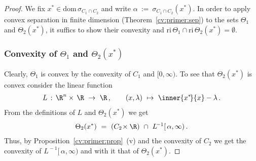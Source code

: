 \begin{proof}
  We fix 
  $ x^* \in \mathrm{dom}\, \sigma_{C_1\cap C_2} $
  and write
  $ 
  \alpha
  \ 
  :=
  \ 
  \sigma_{C_1\cap C_2}(x^*)
  $.
  In order to apply convex separation in finite dimension 
  (Theorem~\ref{cv:primer:sep})
  to
  the sets
  $ \Theta_1 $ and $ \Theta_2(x^*) $,
  it suffics to show
  their convexity and
  $
    \mathrm{ri}\, 
    \Theta_1
    \cap
    \mathrm{ri}\, 
    \Theta_2(x^*)
    =
    \emptyset
  $.
  \subsubsection*{Convexity of 
  $ \Theta_1 $ and $ \Theta_2(x^*) $
  }
  Clearly, 
  $ \Theta_1 $ is convex by the convexity of 
  $ C_1 $ and $ [0,\infty) $.
 To see that $\Theta_2(x^*)$ is convex consider the linear function
 \begin{gather*}
    L
    \,
    :
    \,
    \R^n\times\,  \R 
    \ 
    \to
    \ 
    \R
    \,,
    \qquad 
    (x,\lambda)
    \ 
    \mapsto
    \ 
    \inner{x^*\!}{x} - \lambda
    \,.
 \end{gather*}
 From the definitions of $L$ and $\Theta_2(x^*)$ we get 
  \begin{gather*}
 \Theta_2
 (x^*)
    \ 
    =
    \ 
    (
    C_2\!\times\R
    )
    \ 
    \cap
    \ 
    L^{\!-1}
    [\,\alpha,\infty)
    \,
    .
  \end{gather*}
  Thus,
  by
  Proposition~\ref{cv:primer:prop}~(v)
  and the convexity of $C_2$ we get the convexity of
  $
    L^{\!-1}
    [\,\alpha,\infty)
  $ and with it that of $\Theta_2(x^*)$.


\end{proof}
